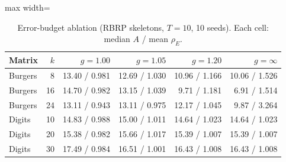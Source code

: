 \begin{table}[t]
\centering\small
\caption{Error-budget ablation (RBRP skeletons, $T{=}10$, 10 seeds). Each cell: median $A$ / mean $\rho_E$.}\label{tab:guard}
\begin{adjustbox}{max width=\linewidth}
\begin{tabular}{lrrrrr}
\toprule
Matrix & $k$ & $g{=}1.00$ & $g{=}1.05$ & $g{=}1.20$ & $g{=}\infty$ \\
\midrule
Burgers & 8 & 13.40 / 0.981 & 12.69 / 1.030 & 10.96 / 1.166 & 10.06 / 1.526 \\
Burgers & 16 & 14.70 / 0.982 & 13.15 / 1.039 & 9.71 / 1.181 & 6.91 / 1.514 \\
Burgers & 24 & 13.11 / 0.943 & 13.11 / 0.975 & 12.17 / 1.045 & 9.87 / 3.264 \\
Digits & 10 & 14.83 / 0.988 & 15.00 / 1.011 & 14.64 / 1.023 & 14.64 / 1.023 \\
Digits & 20 & 15.38 / 0.982 & 15.66 / 1.017 & 15.39 / 1.007 & 15.39 / 1.007 \\
Digits & 30 & 17.49 / 0.984 & 16.51 / 1.001 & 16.43 / 1.008 & 16.43 / 1.008 \\
\bottomrule
\end{tabular}
\end{adjustbox}
\end{table}
